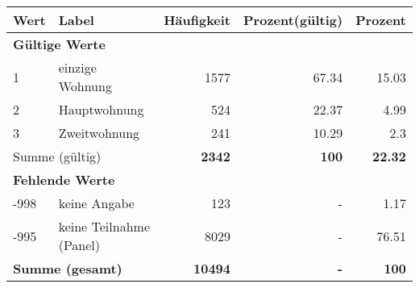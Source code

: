     \begin{longtable}{lXrrr}
     \toprule
     \textbf{Wert} & \textbf{Label} & \textbf{Häufigkeit} & \textbf{Prozent(gültig)} & \textbf{Prozent} \\
     \endhead
     \midrule
     \multicolumn{5}{l}{\textbf{Gültige Werte}}\\

     1 &
     \multicolumn{1}{X}{ einzige Wohnung   } &


       \num{1577} &
       \num[round-mode=places,round-precision=2]{67.34} &
         \num[round-mode=places,round-precision=2]{15.03} \\

     2 &
     \multicolumn{1}{X}{ Hauptwohnung   } &


       \num{524} &
       \num[round-mode=places,round-precision=2]{22.37} &
         \num[round-mode=places,round-precision=2]{4.99} \\

     3 &
     \multicolumn{1}{X}{ Zweitwohnung   } &


       \num{241} &
       \num[round-mode=places,round-precision=2]{10.29} &
         \num[round-mode=places,round-precision=2]{2.3} \\
     \midrule
     \multicolumn{2}{l}{Summe (gültig)} &
       \textbf{\num{2342}} &
     \textbf{\num{100}} &
       \textbf{\num[round-mode=places,round-precision=2]{22.32}} \\
     \multicolumn{5}{l}{\textbf{Fehlende Werte}}\\
       -998 &
       keine Angabe &
         \num{123} &
        - &
         \num[round-mode=places,round-precision=2]{1.17} \\
       -995 &
       keine Teilnahme (Panel) &
         \num{8029} &
        - &
         \num[round-mode=places,round-precision=2]{76.51} \\
     \midrule
     \multicolumn{2}{l}{\textbf{Summe (gesamt)}} &
          \textbf{\num{10494}} &
        \textbf{-} &
        \textbf{\num{100}} \\
     \bottomrule
     \end{longtable}
     
